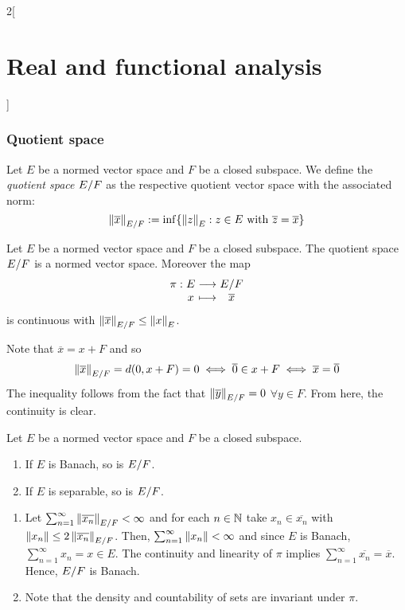 \documentclass[../../../main_math.tex]{subfiles}
\begin{document}
\begin{multicols}{2}[\section{Real and functional analysis}]
  \subsubsection{Quotient space}
  \begin{definition}
    Let $E$ be a normed vector space and $F$ be a closed subspace. We define the \emph{quotient space} $\quot{E}{F}$ as the respective quotient vector space with the associated norm: $$\norm{\overline{x}}_{\quot{E}{F}}:=\inf\{\norm{z}_E:z\in E\text{ with }\overline{z} = \overline{x}\}$$
  \end{definition}
  \begin{proposition}
    Let $E$ be a normed vector space and $F$ be a closed subspace. The quotient space $\quot{E}{F}$ is a normed vector space. Moreover the map $$\function{\pi}{E}{\quot{E}{F}}{x}{\overline{x}}$$ is continuous with $\norm{\overline{x}}_{\quot{E}{F}}\leq \norm{x}_E$.
  \end{proposition}
  \begin{sproof}
    Note that $\overline{x}=x+F$ and so $$\norm{\overline{x}}_{\quot{E}{F}}=d(0,x+F)=0\iff \overline{0}\in x+ F\iff \overline{x}=\overline{0}$$
    The inequality follows from the fact that $\norm{\overline{y}}_{\quot{E}{F}}=0$ $\forall y\in F$. From here, the continuity is clear.
  \end{sproof}
  \begin{lemma}
    Let $E$ be a normed vector space and $F$ be a closed subspace.
    \begin{enumerate}
      \item If $E$ is Banach, so is $\quot{E}{F}$.
      \item If $E$ is separable, so is $\quot{E}{F}$.
    \end{enumerate}
  \end{lemma}
  \begin{sproof}
    \begin{enumerate}
      \item Let $\sum_{n=1}^\infty\norm{\overline{x_n}}_{\quot{E}{F}}<\infty$ and for each $n\in\mathbb{N}$ take $x_n\in\overline{x_n}$ with $\norm{x_n}\leq 2\norm{\overline{x_n}}_{\quot{E}{F}}$. Then, $\sum_{n=1}^\infty\left\|x_n\right\|<\infty$ and since $E$ is Banach, $\sum_{n=1}^\infty x_n=x\in E$. The continuity and linearity of $\pi$ implies $\sum_{n=1}^\infty \overline{x_n}=\overline{x}$. Hence, $\quot{E}{F}$ is Banach.
      \item Note that the density and countability of sets are invariant under $\pi$.
    \end{enumerate}

\end{sproof}
\end{multicols}
\end{document}
